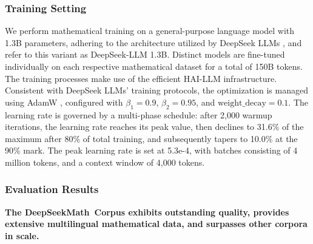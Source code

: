 \subsubsection{Training Setting}
\label{sec:quality-policy}
We perform mathematical training on a general-purpose language model with 1.3B parameters, adhering to the architecture utilized by DeepSeek LLMs \citep{deepseek-llm}, and refer to this variant as DeepSeek-LLM 1.3B. Distinct models are fine-tuned individually on each respective mathematical dataset for a total of 150B tokens. The training processes make use of the efficient HAI-LLM \citep{haillm} infrastructure. Consistent with DeepSeek LLMs' training protocols, the optimization is managed using AdamW \citep{adamW}, configured with $\beta_1=0.9$, $\beta_2=0.95$, and $\mathrm{weight\_decay}=0.1$. The learning rate is governed by a multi-phase schedule: after 2,000 warmup iterations, the learning rate reaches its peak value, then declines to 31.6\% of the maximum after 80\% of total training, and subsequently tapers to 10.0\% at the 90\% mark. The peak learning rate is set at 5.3e-4, with batches consisting of 4 million tokens, and a context window of 4,000 tokens.

\subsubsection{Evaluation Results}

\textbf{The DeepSeekMath~Corpus exhibits outstanding quality, provides extensive multilingual mathematical data, and surpasses other corpora in scale.}

